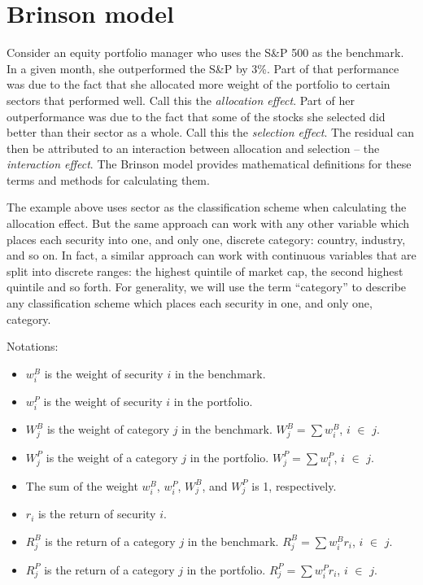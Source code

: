 \section{Brinson model}

Consider an equity portfolio manager who uses the S\&P 500 as the
benchmark. In a given month, she outperformed the S\&P by 3\%. Part of
that performance was due to the fact that she allocated more weight of
the portfolio to certain sectors that performed well. Call this the
\emph{allocation effect}. Part of her outperformance was due to the
fact that some of the stocks she selected did better than their sector
as a whole. Call this the \emph{selection effect}. The residual can
then be attributed to an interaction between allocation and selection
-- the \emph{interaction effect}. The Brinson model provides
mathematical definitions for these terms and methods for calculating
them.

The example above uses sector as the classification scheme when
calculating the allocation effect. But the same approach can work with
any other variable which places each security into one, and only one,
discrete category: country, industry, and so on. In fact, a similar
approach can work with continuous variables that are split into
discrete ranges: the highest quintile of market cap, the second
highest quintile and so forth. For generality, we will use the term
``category'' to describe any classification scheme which places each
security in one, and only one, category.

Notations:
\begin{itemize}
\item $w^B_i$ is the weight of security $i$ in the benchmark.
\item $w^P_i$ is the weight of security $i$ in the portfolio.
\item $W^B_j$ is the weight of category $j$ in the benchmark. $W^B_j
  = \sum w^B_i$, $i$ $\in$ $j$.
\item $W^P_j$ is the weight of a category $j$ in the portfolio. $W^P_j
  = \sum w^P_i$, $i$ $\in$ $j$.
\item The sum of the weight $w^B_i$, $w^P_i$, $W^B_j$, and $W^P_j$ is 1, respectively.
  \item $r_i$ is the return of security $i$.
\item $R^B_j$ is the return of a category $j$ in the benchmark. $R^B_j
  = \sum w^B_ir_i$, $i$ $\in$ $j$.
\item $R^P_j$ is the return of a category $j$ in the portfolio. $R^P_j
  = \sum w^P_ir_i$, $i$ $\in$ $j$.
\end{itemize}

